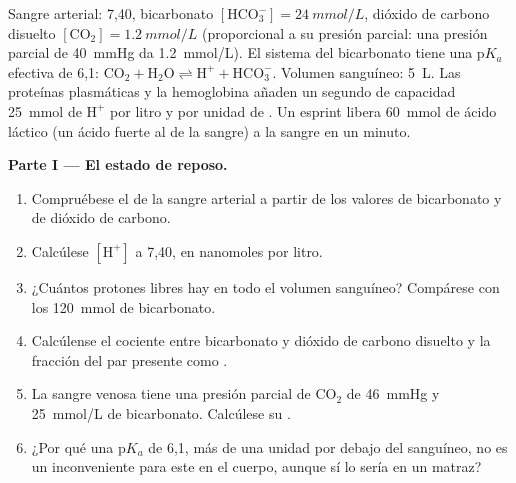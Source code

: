 \begin{problem}
\label{pb:b1:water-small-molecules:1}
Sangre arterial:  7,40, bicarbonato $[\mathrm{HCO_3^-}] =
\qty{24}{mmol/L}$, dióxido de carbono disuelto $[\mathrm{CO_2}] =
\qty{1.2}{mmol/L}$ (proporcional a su presión parcial: una presión parcial
de \qty{40}{mmHg} da \qty{1.2}{mmol/L}). El sistema del bicarbonato tiene
una p$K_a$ efectiva de 6,1: $\mathrm{CO_2} + \mathrm{H_2O}
\rightleftharpoons \mathrm{H^+} + \mathrm{HCO_3^-}$. Volumen sanguíneo:
\qty{5}{L}. Las proteínas plasmáticas y la hemoglobina añaden un segundo
 de capacidad \qty{25}{mmol} de $\mathrm{H^+}$ por litro y por unidad
de . Un esprint libera \qty{60}{mmol} de ácido láctico (un ácido fuerte al
 de la sangre) a la sangre en un minuto.

\medskip
\noindent\textbf{Parte I --- El estado de reposo.}
\begin{enumerate}
  \item Compruébese el  de la sangre arterial a partir de los valores de
        bicarbonato y de dióxido de carbono.
  \item Calcúlese $[\mathrm{H^+}]$ a  7,40, en nanomoles por litro.
  \item ¿Cuántos protones libres hay en todo el volumen sanguíneo?
        Compárese con los \qty{120}{mmol} de bicarbonato.
  \item Calcúlense el cociente entre bicarbonato y dióxido de carbono
        disuelto y la fracción del par  presente como .
  \item La sangre venosa tiene una presión parcial de $\mathrm{CO_2}$ de
        \qty{46}{mmHg} y \qty{25}{mmol/L} de bicarbonato. Calcúlese su
        .
  \item ¿Por qué una p$K_a$ de 6,1, más de una unidad por debajo del 
        sanguíneo, no es un inconveniente para este  en el cuerpo,
        aunque sí lo sería en un matraz?
\end{enumerate}


\end{problem}
